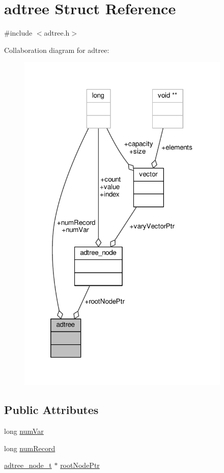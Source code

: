 \hypertarget{structadtree}{\section{adtree Struct Reference}
\label{structadtree}
}


{\ttfamily \#include $<$adtree.\-h$>$}



Collaboration diagram for adtree\-:
\nopagebreak
\begin{figure}[H]
\begin{center}
\leavevmode
\includegraphics[width=288pt]{structadtree__coll__graph}
\end{center}
\end{figure}
\subsection*{Public Attributes}
\begin{DoxyCompactItemize}
\item 
long \hyperlink{structadtree_a1ed48fe47484d51e7433053c51eaad4e}{num\-Var}
\item 
long \hyperlink{structadtree_ad8124b711f662ca007d9f7674d7d60f0}{num\-Record}
\item 
\hyperlink{adtree_8h_a320946afe6df18cfa6bed04e16c49662}{adtree\-\_\-node\-\_\-t} $\ast$ \hyperlink{structadtree_a640a516890892bd5658db1d137f42551}{root\-Node\-Ptr}
\end{DoxyCompactItemize}


